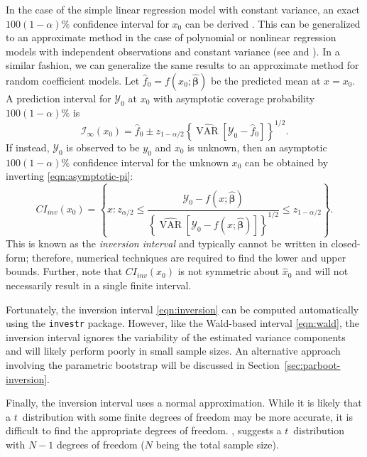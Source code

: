 \documentclass{article}\usepackage[]{graphicx}\usepackage[]{color}
\newcommand{\VAR}{\operatorname{VAR}}
\begin{document}
In the case of the simple linear regression model with constant variance, an exact $100(1-\alpha)\%$ confidence interval for $x_0$ can be derived \citep{graybill-theory-1976}.  This can be generalized to an approximate method in the case of polynomial or nonlinear regression models with independent observations and constant variance (see \citet{seber-nonlinear-2003} and \citet{huet-statistical-2004}).  In a similar fashion, we can generalize the same results to an approximate method for random coefficient models.  Let $\widehat{f}_0 = f\left(x_0; \widehat{\bm{\beta}}\right)$ be the predicted mean at $x = x_0$.  A prediction interval for $\mathcal{Y}_0$ at $x_0$ with asymptotic coverage probability $100(1-\alpha)\%$ is
\begin{equation}
\label{eqn:asymptotic-pi}
  \mathcal{I}_\infty\left(x_0\right) = \widehat{f}_0 \pm z_{1-\alpha/2}\left\{ \widehat{\VAR}\left[\mathcal{Y}_0 - \widehat{f}_0\right] \right\}^{1/2}.
\end{equation}
If instead, $\mathcal{Y}_0$ is observed to be $y_0$ and $x_0$ is unknown, then an asymptotic $100(1-\alpha)\%$ confidence interval for the unknown $x_0$ can be obtained by inverting \eqref{eqn:asymptotic-pi}:
\begin{equation}
\label{eqn:inversion}
  CI_{inv}\left(x_0\right) = \left\{ x: z_{\alpha/2} \le \frac{\mathcal{Y}_0-f\left(x; \widehat{\bm{\beta}}\right)}{\left\{ \widehat{\VAR}\left[\mathcal{Y}_0 - f\left(x; \widehat{\bm{\beta}}\right)\right] \right\}^{1/2}} \le z_{1-\alpha/2} \right\}.
\end{equation}
This is known as the \emph{inversion interval} and typically cannot be written in closed-form; therefore, numerical techniques are required to find the lower and upper bounds.  Further, note that $CI_{inv}\left(x_0\right)$ is not symmetric about $\widehat{x}_0$ and will not necessarily result in a single finite interval.

Fortunately, the inversion interval \eqref{eqn:inversion} can be computed automatically using the \texttt{investr} package.  However, like the Wald-based interval \eqref{eqn:wald}, the inversion interval ignores the variability of the estimated variance components and will likely perform poorly in small sample sizes.  An alternative approach involving the parametric bootstrap will be discussed in Section~\ref{sec:parboot-inversion}.

Finally, the inversion interval uses a normal approximation.  While it is likely that a $t$~distribution with some finite degrees of freedom may be more accurate, it is difficult to find the appropriate degrees of freedom. \citet{oman-calibration-1998}, suggests a $t$~distribution with $N-1$ degrees of freedom ($N$ being the total sample size).
\end{document}
